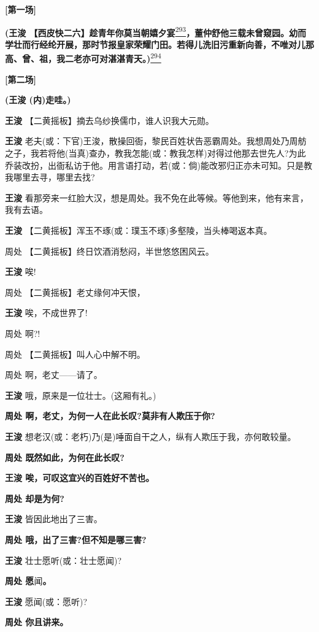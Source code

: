 \textbf{{[}第一场{]}}

\textbf{(王浚
【西皮快二六】趁青年你莫当朝嬉夕宴}\protect\hyperlink{fn293}{\textsuperscript{293}}\textbf{，董仲舒他三载未曾窥园。幼而学壮而行经纶开展，那时节报皇家荣耀门田。若得儿洗旧污重新向善，不唯对儿那高、曾、祖，我二老亦可对湛湛青天。)}\protect\hyperlink{fn294}{\textsuperscript{294}}

\textbf{{[}第二场{]}}

\textbf{(王浚 (内)走哇。)}

\textbf{王浚} 【二黄摇板】摘去乌纱换儒巾，谁人识我大元勋。

\textbf{王浚}
老夫(或：下官)王浚，散操回衙，黎民百姓状告恶霸周处。我想周处乃周舫之子，我若将他(当真)查办，教我怎能(或：教我怎样)对得过他那去世先人?为此乔装改扮，出衙私访于他。用言语打动，若(或：倘)能改邪归正亦未可知。只是教我哪里去寻，哪里去找?

\textbf{王浚}
看那旁来一红脸大汉，想是周处。我不免在此等候。等他到来，他有来言，我有去语。

\textbf{王浚} 【二黄摇板】浑玉不琢(或：璞玉不琢)多壑陵，当头棒喝返本真。

周处 【二黄摇板】终日饮酒消愁闷，半世悠悠困风云。

\textbf{王浚} 唉!

周处 【二黄摇板】老丈缘何冲天恨，

\textbf{王浚} 唉，不成世界了!

周处 啊?!

周处 【二黄摇板】叫人心中解不明。

周处 啊，老丈------请了。

\textbf{王浚} 哦，原来是一位壮士。(这厢有礼。)

\textbf{周处 啊，老丈，为何一人在此长叹?莫非有人欺压于你?}

\textbf{王浚}
想老汉(或：老朽)乃(是)唾面自干之人，纵有人欺压于我，亦何敢较量。

\textbf{周处 既然如此，为何在此长叹?}

\textbf{王浚 唉，可叹这宜兴的百姓好不苦也。}

\textbf{周处 却是为何?}

\textbf{王浚} 皆因此地出了三害。

\textbf{周处 哦，出了三害?但不知是哪三害?}

\textbf{王浚} 壮士愿听(或：壮士愿闻)?

\textbf{周处 愿}闻\textbf{。}

\textbf{王浚} 愿闻(或：愿听)?

\textbf{周处 你且讲来。}

